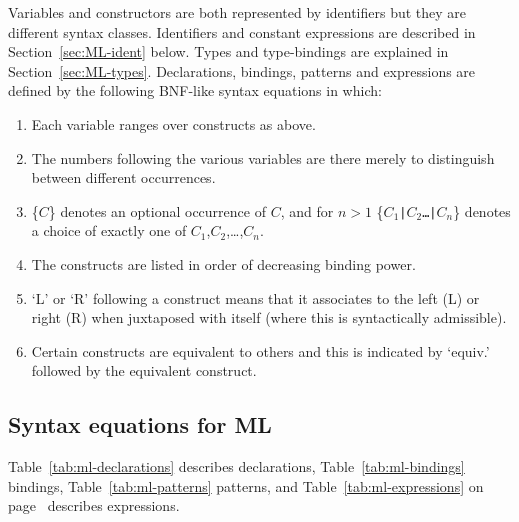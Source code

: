 \documentclass[11pt]{article}
\begin{document}
Variables and constructors are both represented by identifiers but they are
different syntax classes.  Identifiers and constant expressions are described in
Section~\ref{sec:ML-ident} below.  Types and type-bindings are explained in
Section~\ref{sec:ML-types}.  Declarations, bindings, patterns and expressions
are defined by the following BNF-like syntax
equations in which:

\begin{enumerate}\vspace*{-2mm}\setlength{\itemsep}{0mm}

  \item Each variable ranges over constructs as above.

  \item The numbers following the various variables are there merely to
      	distinguish between different occurrences.

  \item \{$C$\} denotes an optional occurrence of $C$, and for $n{>}1$
      	\{{\tt$C_1$|$C_2$\ldots|$C_n$}\} denotes a choice of exactly one of
      	$C_1$,$C_2$,\ldots,$C_n$.

  \item The constructs are listed in order of decreasing binding
	power.

  \item `L' or `R' following a construct means that it
	associates to the left (L) or right (R) when juxtaposed with
	itself (where this is syntactically admissible).

  \item Certain constructs are equivalent to others and this is indicated by
	`equiv.' followed by the equivalent construct.
\end{enumerate}

\subsection{Syntax equations for ML}

Table~\ref{tab:ml-declarations} describes {\ML} declarations,
Table~\ref{tab:ml-bindings} bindings, Table~\ref{tab:ml-patterns} patterns, and
Table~\ref{tab:ml-expressions} on page~\pageref{tab:ml-expressions}
describes expressions.\\\smallskip
\end{document}
